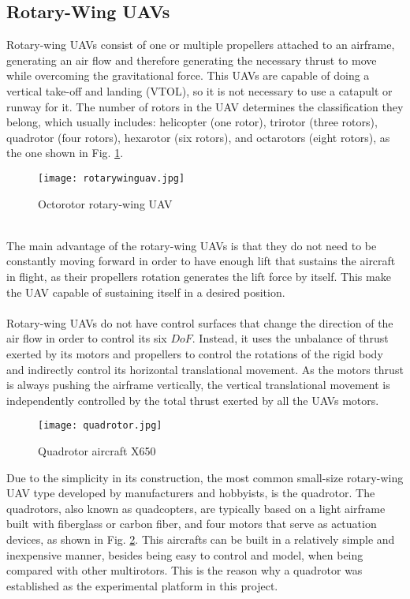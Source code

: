 \subsection{Rotary-Wing UAVs}
Rotary-wing UAVs consist of one or multiple propellers attached to an airframe, generating an air flow and therefore generating the necessary thrust to move while overcoming the gravitational force. This UAVs are capable of doing a vertical take-off and landing (VTOL), so it is not necessary to use a catapult or runway for it. The number of rotors in the UAV determines the classification they belong, which usually includes: helicopter (one rotor), trirotor (three rotors), quadrotor (four rotors), hexarotor (six rotors), and octarotors (eight rotors), as the one shown in Fig. \ref{fig:rotarywing}.
\begin{figure}[h]
\begin{center}
\texttt{[image: rotarywinguav.jpg]}    
\caption[Octorotor rotary-wing UAV]{Octorotor rotary-wing UAV\protect\footnotemark} 
\label{fig:rotarywing}
\end{center}
\end{figure}
\\The main advantage of the rotary-wing UAVs is that they do not need to be constantly moving forward in order to have enough lift that sustains the aircraft in flight, as their propellers rotation generates the lift force by itself. This make the UAV capable of sustaining itself in a desired position.
\\\\
Rotary-wing UAVs do not have control surfaces that change the direction of the air flow in order to control its six $DoF$. Instead, it uses the unbalance of thrust exerted by its motors and propellers to control the rotations of the rigid body and indirectly control its horizontal translational movement. As the motors thrust is always pushing the airframe vertically, the vertical translational movement is independently controlled by the total thrust exerted by all the UAVs motors.
\begin{figure}[H]
\begin{center}
\texttt{[image: quadrotor.jpg]}    
\caption[Quadrotor aircraft X650]{Quadrotor aircraft X650 \protect\footnotemark} 
\label{fig:quadrotarywing}
\end{center}
\end{figure}
Due to the simplicity in its construction, the most common small-size rotary-wing UAV type developed by manufacturers and hobbyists, is the quadrotor. The quadrotors, also known as quadcopters, are typically based on a light airframe built with fiberglass or carbon fiber, and four motors that serve as actuation devices, as shown in Fig. \ref{fig:quadrotarywing}. This aircrafts  can be built in a relatively simple and inexpensive manner, besides being easy to control and model, when being compared with other multirotors. This is the reason why a quadrotor was established as the experimental platform in this project.
\\\\
